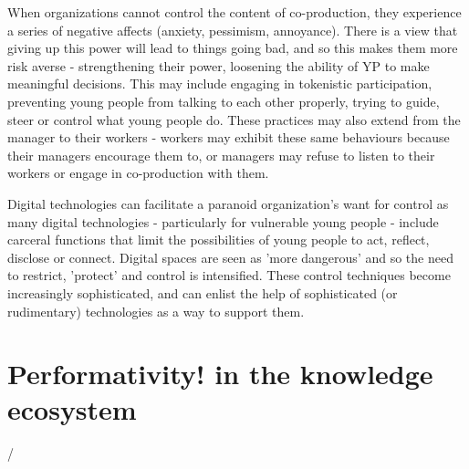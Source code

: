 When organizations cannot control the content of co-production, they experience a series of negative affects (anxiety, pessimism, annoyance). There is a view that giving up this power will lead to things going bad, and so this makes them more risk averse - strengthening their power, loosening the ability of YP to make meaningful decisions. This may include engaging in tokenistic participation, preventing young people from talking to each other properly, trying to guide, steer or control what young people do.
These practices may also extend from the manager to their workers - workers may exhibit these same behaviours because their managers encourage them to, or managers may refuse to listen to their workers or engage in co-production with them.

Digital technologies can facilitate a paranoid organization's want for control as many digital technologies - particularly for vulnerable young people - include carceral functions that limit the possibilities of young people to act, reflect, disclose or connect. Digital spaces are seen as 'more dangerous' and so the need to restrict, 'protect' and control is intensified.
These control techniques become increasingly sophisticated, and can enlist the help of sophisticated (or rudimentary) technologies as a way to support them.


\section{Performativity! in the knowledge ecosystem}
/

